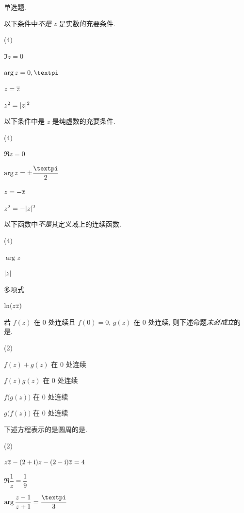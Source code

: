 \begin{homework}
  \item 单选题.
  \begin{homework}
    \item 以下条件中\fillbrace{}\emph{不是} $z$ 是实数的充要条件.
    \begin{exchoice}(4)
      \item $\Im z=0$
      \item $\arg z=0,\cpi$
      \item $z=\overline z$
      \item $z^2=\lvert z\rvert^2$
    \end{exchoice}
    \item 以下条件中\fillbrace{}是 $z$ 是纯虚数的充要条件.
    \begin{exchoice}(4)
      \item $\Re z=0$
      \item $\arg z=\pm\dfrac\cpi2$
      \item $z=-\overline z$
      \item $z^2=-\lvert z\rvert^2$
    \end{exchoice}
    \item 以下函数中\fillbrace{}\emph{不是}其定义域上的连续函数.
    \begin{exchoice}(4)
      \item $\arg z$
      \item $\lvert z\rvert$
      \item 多项式
      \item $\ln(z\overline z)$
    \end{exchoice}
    \item 若 $f(z)$ 在 $0$ 处连续且 $f(0)=0$, $g(z)$ 在 $0$ 处连续, 则下述命题\emph{未必成立}的是\fillbrace{}.
    \begin{exchoice}(2)
      \item $f(z)+g(z)$ 在 $0$ 处连续
      \item $f(z)g(z)$ 在 $0$ 处连续
      \item $f\bigl(g(z)\bigr)$ 在 $0$ 处连续
      \item $g\bigl(f(z)\bigr)$ 在 $0$ 处连续
    \end{exchoice}
    \item 下述方程表示的是圆周的是\fillbrace{}.
    \begin{exchoice}(2)
      \item $z\overline z-(2+\mathrm{i})z-(2-\mathrm{i})\overline z=4$
      \item $\Re\dfrac{1}{z}=\dfrac{1}{9}$
      \item $\arg\dfrac{z-1}{z+1}=\dfrac{\cpi}{3}$

\end{exchoice}
\end{homework}
\end{homework}
